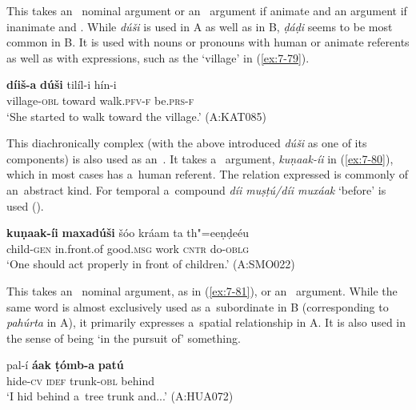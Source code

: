\begin{exe}
 This  takes an~ nominal argument or an~  argument if animate and an  argument if inanimate and . While \textit{dúši} is used in A as well as in B, \textit{ḍáḍi} seems to be most common in B. It is used with nouns or pronouns with human or animate referents as well as with  expressions, such as the `village' in (\ref{ex:7-79}). 

\begin{exe}
\ex
\label{ex:7-79}
\gll \textbf{díiš-a} \textbf{dúši} tilíl-i hín-i \\
village-\textsc{obl} toward walk.\textsc{pfv-f} be.\textsc{prs-f} \\
\glt `She started to walk toward the village.' (A:KAT085)
\end{exe}

 This diachronically complex  (with the above introduced \textit{dúši} as one of its components) is also used as an~. It takes a~ argument, \textit{kuṇaak-íi} in (\ref{ex:7-80}), which in most cases has a~human referent. The relation expressed is commonly of an~abstract kind. For temporal  a~compound  \textit{díi muṣṭú/díi muxáak} `before' is used ().

\begin{exe}
\ex
\label{ex:7-80}
\gll \textbf{kuṇaak-íi} \textbf{maxadúši} šóo kráam ta th"=eeṇḍeéu \\
child-\textsc{gen}  in.front.of good.\textsc{msg} work \textsc{cntr} do-\textsc{oblg} \\
\glt `One should act properly in front of children.' (A:SMO022)
\end{exe}


 This  takes an~ nominal argument, as in (\ref{ex:7-81}), or an~  argument. While the same word is almost exclusively used as a~subordinate  in B (corresponding to \textit{pahúrta} in A), it primarily expresses a~spatial relationship in A. It is also used in the sense of being `in the pursuit of' something.

\begin{exe}
\ex
\label{ex:7-81}
\gll pal-í \textbf{áak} \textbf{ṭómb-a} \textbf{patú} \\
hide-\textsc{cv} \textsc{idef} trunk-\textsc{obl} behind \\
\glt `I hid behind a~tree trunk and...' (A:HUA072)
\end{exe}



\end{exe}
